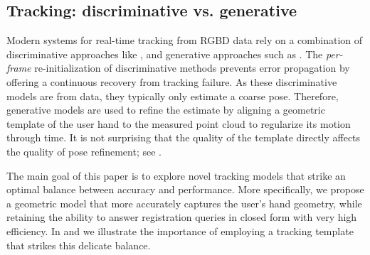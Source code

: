\subsection*{Tracking: discriminative vs. generative}
Modern systems for real-time tracking from RGBD data  \cite{sridhar2015fast,sharp2015accurate} rely on a combination of discriminative approaches like \cite{keskin2012hand}, and generative approaches such as \cite{oiko2011hand}. The \emph{per-frame} re-initialization of discriminative methods prevents error propagation by offering a continuous recovery from tracking failure. As these discriminative models are  from data, they typically only estimate a coarse pose. Therefore, generative models are used to refine the estimate by aligning a geometric template of the user hand to the measured point cloud  to regularize its motion through time. It is not surprising that the quality of the template directly affects the quality of pose refinement; see . 



The main goal of this paper is to explore novel tracking models that strike an optimal balance between accuracy and performance.
% 
% 
More specifically, we propose a geometric model that more accurately captures the user's hand geometry, while retaining the ability to answer registration queries in closed form with very high efficiency. In  and 
\VideoHTrack{} we illustrate the importance of employing a tracking template that strikes this delicate balance.

